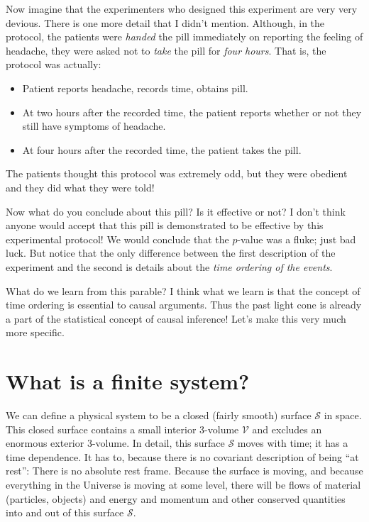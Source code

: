 \documentclass[12pt]{article}
\begin{document}
Now imagine that the experimenters who designed this experiment are very very devious.
There is one more detail that I didn't mention.
Although, in the protocol, the patients were \emph{handed} the pill immediately on reporting the feeling of headache, they were asked not to \emph{take} the pill for \emph{four hours}.
That is, the protocol was actually:
\begin{itemize}
\item Patient reports headache, records time, obtains pill.
\item At two hours after the recorded time, the patient reports whether or not they still have symptoms of headache.
\item At four hours after the recorded time, the patient takes the pill.
\end{itemize}
The patients thought this protocol was extremely odd, but they were obedient and they did what they were told!

Now what do you conclude about this pill?
Is it effective or not?
I don't think anyone would accept that this pill is demonstrated to be effective by this experimental protocol!
We would conclude that the $p$-value was a fluke; just bad luck.
But notice that the only difference between the first description of the experiment and the second is details about the \emph{time ordering of the events}.

What do we learn from this parable?
I think what we learn is that the concept of time ordering is essential to causal arguments.
Thus the past light cone is already a part of the statistical concept of causal inference!
Let's make this very much more specific.

\section{What is a finite system?}

We can define a physical system to be a closed (fairly smooth) surface $\mathcal S$ in space.
This closed surface contains a small interior 3-volume $\mathcal V$ and excludes an enormous exterior 3-volume.
In detail, this surface $\mathcal S$ moves with time; it has a time dependence.
It has to, because there is no covariant description of being ``at rest'':
There is no absolute rest frame.
Because the surface is moving, and because everything in the Universe is moving at some level,
there will be flows of material (particles, objects) and energy and momentum and other conserved quantities into and out of this surface $\mathcal S$.
\end{document}
